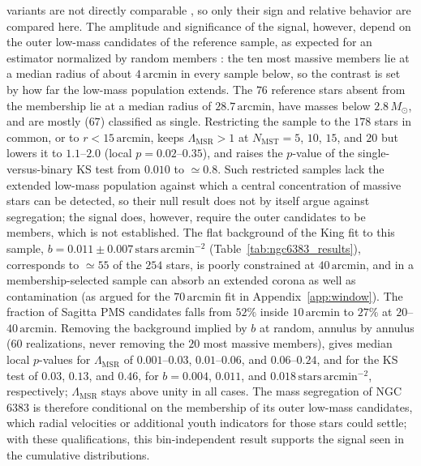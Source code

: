 \documentclass{aa}
\begin{document}
variants are not directly comparable \citep{2011MNRAS.416..541M}, so only their sign and relative behavior are compared here. The amplitude and significance of the signal, however, depend on the outer low-mass candidates of the reference sample, as expected for an estimator normalized by random members \citep{2015MNRAS.449.3381P}: the ten most massive members lie at a median radius of about $4\,\mathrm{arcmin}$ in every sample below, so the contrast is set by how far the low-mass population extends. The $76$ reference stars absent from the \citet{2024arXiv240305143H} membership lie at a median radius of $28.7\,\mathrm{arcmin}$, have masses below $2.8\,M_\odot$, and are mostly ($67$) classified as single. Restricting the sample to the $178$ stars in common, or to $r<15\,\mathrm{arcmin}$, keeps $\Lambda_{\mathrm{MSR}}>1$ at $N_{\mathrm{MST}}=5$, $10$, $15$, and $20$ but lowers it to $1.1$--$2.0$ (local $p=0.02$--$0.35$), and raises the $p$-value of the single-versus-binary KS test from $0.010$ to $\simeq0.8$. Such restricted samples lack the extended low-mass population against which a central concentration of massive stars can be detected, so their null result does not by itself argue against segregation; the signal does, however, require the outer candidates to be members, which is not established. The flat background of the King fit to this sample, $b=0.011\pm0.007\,\mathrm{stars\,arcmin^{-2}}$ (Table~\ref{tab:ngc6383_results}), corresponds to $\simeq55$ of the $254$ stars, is poorly constrained at $40\,\mathrm{arcmin}$, and in a membership-selected sample can absorb an extended corona as well as contamination (as argued for the $70\,\mathrm{arcmin}$ fit in Appendix~\ref{app:window}). The fraction of Sagitta PMS candidates falls from $52\%$ inside $10\,\mathrm{arcmin}$ to $27\%$ at $20$--$40\,\mathrm{arcmin}$. Removing the background implied by $b$ at random, annulus by annulus ($60$ realizations, never removing the $20$ most massive members), gives median local $p$-values for $\Lambda_{\mathrm{MSR}}$ of $0.001$--$0.03$, $0.01$--$0.06$, and $0.06$--$0.24$, and for the KS test of $0.03$, $0.13$, and $0.46$, for $b=0.004$, $0.011$, and $0.018\,\mathrm{stars\,arcmin^{-2}}$, respectively; $\Lambda_{\mathrm{MSR}}$ stays above unity in all cases. The mass segregation of NGC 6383 is therefore conditional on the membership of its outer low-mass candidates, which radial velocities or additional youth indicators for those stars could settle; with these qualifications, this bin-independent result supports the signal seen in the cumulative distributions.
\end{document}
